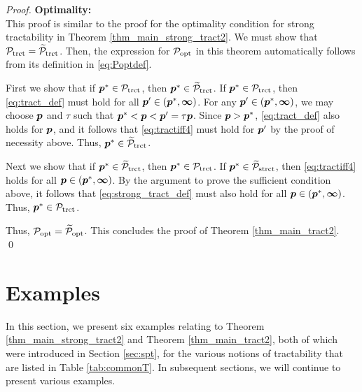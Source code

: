 \documentclass[sort&compress]{elsarticle}
\newcommand{\vinfty}{\boldsymbol{\infty}}
\begin{document}
\begin{proof}
\noindent \textbf{Optimality:} \\
This proof is similar to the proof for the optimality condition for strong tractability in Theorem \ref{thm_main_strong_tract2}. We must show that $\mathcal{P}_{\textup{trct}} = \widetilde{\mathcal{P}}_{\textup{trct}}$.  Then, the expression for  $\mathcal{P}_{\textup{opt}}$ in this theorem automatically follows from its definition in \eqref{eq:Poptdef}.

First we show  that if $\boldsymbol{p}^* \in \mathcal{P}_{\textup{trct}}$, then $\boldsymbol{p}^* \in \widetilde{\mathcal{P}}_{\textup{trct}}$.  If $\boldsymbol{p}^* \in \mathcal{P}_{\textup{trct}}$, then \eqref{eq:tract_def} must hold for all $\vp' \in (\vp^*,\vinfty)$.  For any $\vp' \in (\vp^*,\vinfty)$, we may choose $\boldsymbol{p}$ and $\tau$ such that $\boldsymbol{p}^* < \boldsymbol{p} < \boldsymbol{p}' = \tau \boldsymbol{p}$. Since $\boldsymbol{p} > \boldsymbol{p}^*$, \eqref{eq:tract_def} also holds for $\boldsymbol{p}$, and it follows that \eqref{eq:tractiff4} must hold for $\boldsymbol{p}'$ by the proof of necessity above.  Thus, $\boldsymbol{p}^* \in \widetilde{\mathcal{P}}_{\textup{trct}}$.

Next we show that if $\boldsymbol{p}^* \in \widetilde{\mathcal{P}}_{\textup{trct}}$, then $\boldsymbol{p}^* \in \mathcal{P}_{\textup{trct}}$.  If $\boldsymbol{p}^* \in \widetilde{\mathcal{P}}_{\textup{strct}}$, then \eqref{eq:tractiff4}  holds for all $\vp \in (\vp^*,\vinfty)$.  By the argument to prove the sufficient condition above, it follows that \eqref{eq:strong_tract_def} must also hold for all $\vp \in (\vp^*,\vinfty)$. Thus, $\boldsymbol{p}^* \in \mathcal{P}_{\textup{trct}}$.


Thus,  $\mathcal{P}_{\textup{opt}}= \widetilde{\mathcal{P}}_{\textup{opt}}$.  This concludes the proof of Theorem \ref{thm_main_tract2}.  \qed
\end{proof}


\section{Examples} \label{sec:examples}
In this section, we present six examples relating to Theorem \ref{thm_main_strong_tract2} and Theorem \ref{thm_main_tract2}, both of which were introduced in Section \ref{sec:spt}, for the various notions of tractability that are listed in Table \ref{tab:commonT}. In subsequent sections, we will continue to present various examples.


\end{document}

